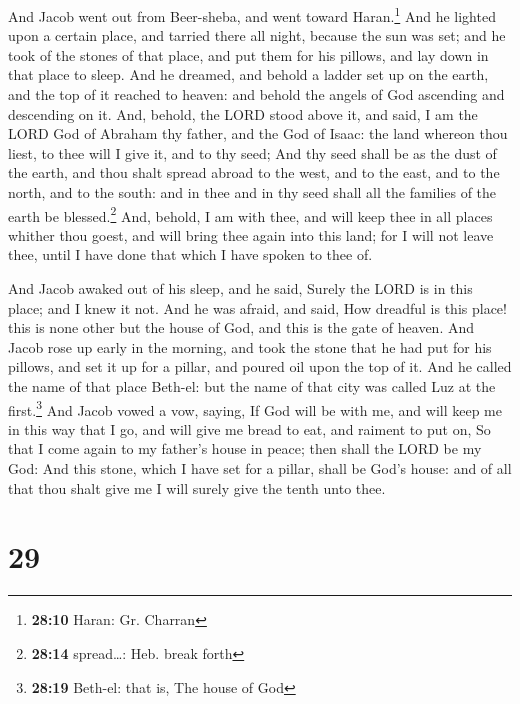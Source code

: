  And Jacob went out from Beer-sheba, and went toward
Haran.\footnote{\textbf{28:10} Haran: Gr. Charran}  And
he lighted upon a certain place, and tarried there all night, because
the sun was set; and he took of the stones of that place, and put them
for his pillows, and lay down in that place to sleep. 
And he dreamed, and behold a ladder set up on the earth, and the top of
it reached to heaven: and behold the angels of God ascending and
descending on it.  And, behold, the LORD stood above it,
and said, I am the LORD God of Abraham thy father, and the God of Isaac:
the land whereon thou liest, to thee will I give it, and to thy seed;
 And thy seed shall be as the dust of the earth, and thou
shalt spread abroad to the west, and to the east, and to the north, and
to the south: and in thee and in thy seed shall all the families of the
earth be blessed.\footnote{\textbf{28:14} spread\ldots: Heb. break forth}
 And, behold, I am with thee, and will keep thee in all
places whither thou goest, and will bring thee again into this land; for
I will not leave thee, until I have done that which I have spoken to
thee of.

 And Jacob awaked out of his sleep, and he said, Surely
the LORD is in this place; and I knew it not.  And he was
afraid, and said, How dreadful is this place! this is none other but the
house of God, and this is the gate of heaven.  And Jacob
rose up early in the morning, and took the stone that he had put for his
pillows, and set it up for a pillar, and poured oil upon the top of it.
 And he called the name of that place Beth-el: but the
name of that city was called Luz at the first.\footnote{\textbf{28:19}
  Beth-el: that is, The house of God}  And Jacob vowed a
vow, saying, If God will be with me, and will keep me in this way that I
go, and will give me bread to eat, and raiment to put on,
 So that I come again to my father's house in peace; then
shall the LORD be my God:  And this stone, which I have
set for a pillar, shall be God's house: and of all that thou shalt give
me I will surely give the tenth unto thee.

\hypertarget{section-28}{%
\section{29}\label{section-28}}

